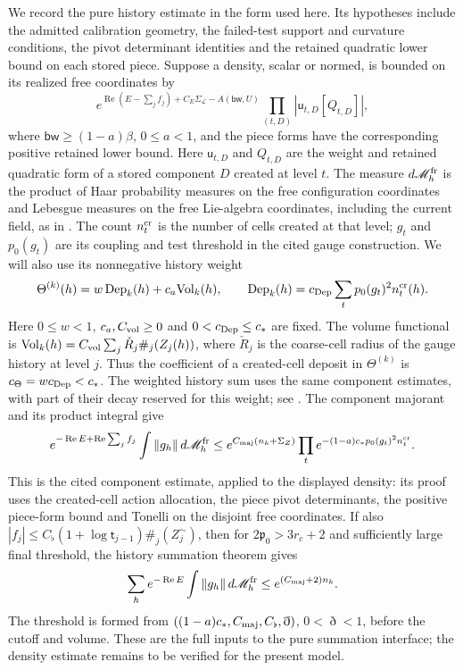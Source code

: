 \documentclass[11pt,letterpaper,reqno]{amsart}
\theoremstyle{definition}
\theoremstyle{remark}
\begin{document}
We record the pure history estimate in the form used here.
Its hypotheses include the admitted calibration geometry,
the failed-test support and curvature conditions, the pivot
determinant identities and the retained quadratic lower bound
on each stored piece. Suppose a density, scalar or normed,
is bounded on its realized free coordinates by
\[
 e^{\operatorname{Re}(E-\sum_j f_j)+C_E\Sigma_{\mathcal L}-A(\mathsf{bw},U)}
 \prod_{(t,D)}|\mathsf u_{t,D}[Q_{t,D}]|,
\]
where $\mathsf{bw}\ge(1-a)\beta$, $0\le a<1$, and the
piece forms have the corresponding positive retained lower
bound. Here $\mathsf u_{t,D}$ and $Q_{t,D}$ are the weight and
retained quadratic form of a stored component $D$ created at level
$t$. The measure $d\mathscr M_h^{\rm fr}$ is the product of Haar
probability measures on the free configuration coordinates and
Lebesgue measures on the free Lie-algebra coordinates, including
the current field, as in \cite[Equation~(984)]{YMM1}.
The count $n_t^{\rm cr}$
is the number of cells created at that level; $g_t$ and $p_0(g_t)$
are its coupling and test threshold in the cited gauge construction.
We will also use its nonnegative history weight
\[
 \Theta^{(k)}(h)=w\,\mathrm{Dep}_k(h)+c_a\mathrm{Vol}_k(h),
 \qquad
 \mathrm{Dep}_k(h)=c_{\rm Dep}\sum_t p_0(g_t)^2n_t^{\rm cr}(h).
\]
Here $0\le w<1$, $c_a,C_{\rm vol}\ge0$ and
$0<c_{\rm Dep}\le c_*$ are fixed. The volume functional is
$\mathrm{Vol}_k(h)=C_{\rm vol}\sum_j\check R_j\#_j(Z_j(h))$,
where $\check R_j$ is the coarse-cell radius of the gauge history
at level $j$. Thus the coefficient of a created-cell deposit in
$\Theta^{(k)}$ is $c_\Theta=wc_{\rm Dep}<c_*$.
The weighted history sum uses the same component estimates,
with part of their decay reserved for this weight; see
\cite[Equations~(1455)--(1456) and their preceding definitions,
p.~592]{YMM1}.
The component majorant and its product integral
\cite[Propositions~66.2 and 66.3]{YMM1} give
\begin{equation}\label{eq:qcd-history-interface}
 e^{-\operatorname{Re}E+\operatorname{Re}\sum_jf_j}
 \int\|g_h\|\,d\mathscr M_h^{\rm fr}
 \le e^{C_{\rm maj}(n_k+\Sigma_Z)}
 \prod_t e^{-(1-a)c_*p_0(g_t)^2n_t^{\rm cr}}.
\end{equation}
This is the cited component estimate, applied to the displayed
density: its proof uses the created-cell action allocation,
the piece pivot determinants, the positive piece-form bound
and Tonelli on the disjoint free coordinates. If also
$|f_j|\le C_\flat(1+\log\mathsf t_{j-1})\#_j(Z_j^\sim)$,
then for $2\mathfrak p_0>3r_c+2$ and sufficiently large final
threshold, the history summation theorem gives
\begin{equation}\label{eq:qcd-history-sum-interface}
 \sum_h e^{-\operatorname{Re}E}\int\|g_h\|
          \,d\mathscr M_h^{\rm fr}\le e^{(C_{\rm maj}+2)n_k}.
\end{equation}
The threshold is formed from
$((1-a)c_*,C_{\rm maj},C_\flat,\eth)$, $0<\eth<1$, before
the cutoff and volume. These are the full inputs to the pure
summation interface; the density estimate remains to be
verified for the present model.
\end{document}
